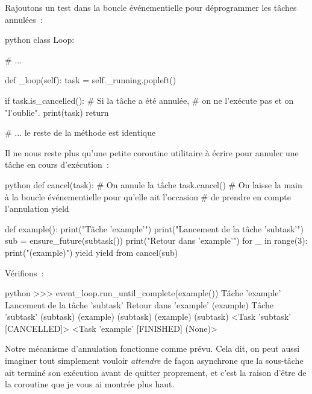 \documentclass[small]{zmdocument}
\begin{document}
Rajoutons un test dans la boucle événementielle pour déprogrammer les tâches
annulées :



\begin{CodeBlock}{python}
class Loop:

    # ...

    def _loop(self):
        task = self._running.popleft()

        if task.is_cancelled():
            # Si la tâche a été annulée,
            # on ne l'exécute pas et on "l'oublie".
            print(task)
            return

        # ... le reste de la méthode est identique
\end{CodeBlock}



Il ne nous reste plus qu’une petite coroutine utilitaire à écrire pour annuler
une tâche en cours d’exécution :



\begin{CodeBlock}{python}
def cancel(task):
    # On annule la tâche
    task.cancel()
    # On laisse la main à la boucle événementielle pour qu'elle ait l'occasion
    # de prendre en compte l'annulation
    yield

def example():
    print("Tâche 'example'")
    print("Lancement de la tâche 'subtask'")
    sub = ensure_future(subtask())
    print("Retour dans 'example'")
    for _ in range(3):
        print("(example)")
        yield
    yield from cancel(sub)
\end{CodeBlock}



Vérifions :



\begin{CodeBlock}{python}
>>> event_loop.run_until_complete(example())
Tâche 'example'
Lancement de la tâche 'subtask'
Retour dans 'example'
(example)
Tâche 'subtask'
(subtask)
(example)
(subtask)
(example)
(subtask)
<Task 'subtask' [CANCELLED]>
<Task 'example' [FINISHED] (None)>
\end{CodeBlock}



Notre mécanisme d’annulation fonctionne comme prévu. Cela dit, on peut aussi
imaginer tout simplement vouloir \textit{attendre} de façon asynchrone que la
sous-tâche ait terminé son exécution avant de quitter proprement, et c’est la raison d’être de la coroutine  que je vous ai montrée plus haut. 
\end{document}

